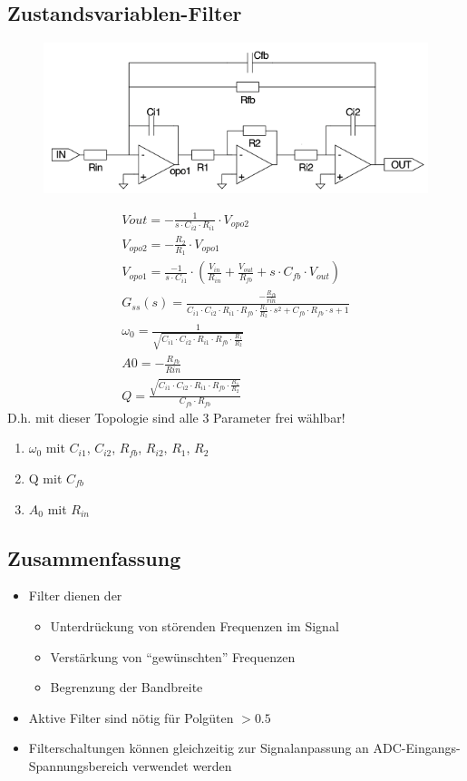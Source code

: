 \subsection{Zustandsvariablen-Filter}
\begin{figure}[!h]
\centering
 \includegraphics[scale=0.5]{pictures/zustandsvariable}
\end{figure}
\begin{gather}
V{out}=-\frac{1}{s\cdot C_{i2}\cdot R_{i1}}\cdot V_{opo2}\\
V_{opo2}=-\frac{R_2}{R_1}\cdot V_{opo1}\\
V_{opo1}=\frac{-1}{s\cdot C_{i1}}\cdot (\frac{V_{in}}{R_{in}}+\frac{V_{out}}{R_{fb}}+s\cdot C_{fb}\cdot V_{out})\\
G_{ss}(s)=\frac{-\frac{R_{fb}}{rin}}{C_{i1}\cdot C_{i2}\cdot R_{i1}\cdot R_{fb}\cdot \frac{R_1}{R_2}\cdot s^2+C_{fb}\cdot R_{fb}\cdot s+1}\\
\omega_{0}=\frac{1}{\sqrt{C_{i1}\cdot C_{i2}\cdot R_{i1}\cdot R_{fb}\cdot \frac{R_1}{R_2}}}\\
A0=-\frac{R_{fb}}{Rin}\\
Q=\frac{\sqrt{C_{i1}\cdot C_{i2}\cdot R_{i1}\cdot R_{fb}\cdot \frac{R_1}{R_2}}}{C_{fb}\cdot R_{fb}}
\end{gather}
D.h. mit dieser Topologie sind alle 3 Parameter frei wählbar!
\begin{enumerate}
  \item $\omega_{0}$ mit $C_{i1}$, $C_{i2}$, $R_{fb}$, $R_{i2}$, $R_1$, $R_2$
  \item Q mit $C_{fb}$
  \item $A_0$ mit $R_{in}$
\end{enumerate}

\subsection{Zusammenfassung}
\begin{itemize}
  \item Filter dienen der
  \begin{itemize}
    \item Unterdrückung von störenden Frequenzen im Signal
    \item Verstärkung von "`gewünschten"' Frequenzen
    \item Begrenzung der Bandbreite
   \end{itemize}
   \item Aktive Filter sind nötig für Polgüten $>0.5$
   \item Filterschaltungen können gleichzeitig zur Signalanpassung an
   ADC-Eingangs-Spannungsbereich verwendet werden
\end{itemize}


